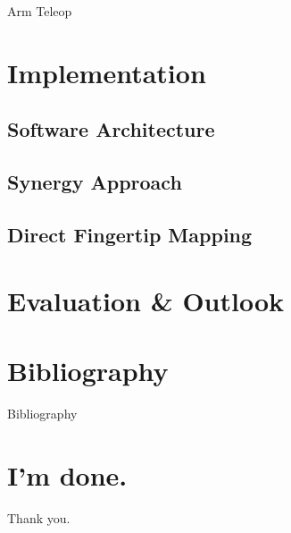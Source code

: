 \documentclass[t]{beamer}
\begin{document}
\begin{frame}{Arm Teleop}
\begin{figure}
\end{figure}
\end{frame}

\section{Implementation}
\subsection{Software Architecture}
\subsection{Synergy Approach}
\subsection{Direct Fingertip Mapping}

\section{Evaluation \& Outlook}

\section{Bibliography}

\begin{frame}[allowframebreaks]{Bibliography}
\printbibliography
\end{frame}

\section*{I'm done.}

\begin{frame}[c]
\centering
Thank you.
\end{frame}
\end{document}
